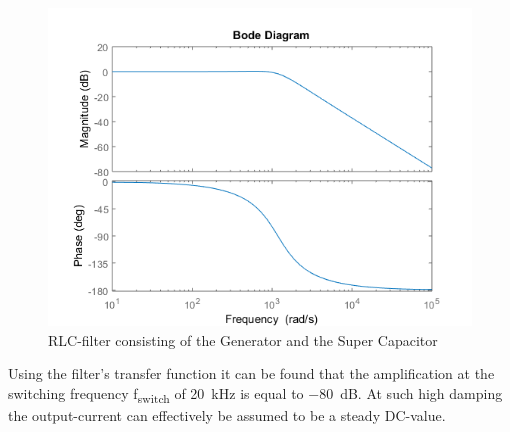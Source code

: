 \begin{figure}[H]
	\centering
	\includegraphics[width=0.7\linewidth]{Hardware/LoadSystem/BodeFilter}
	\caption{RLC-filter consisting of the Generator and the Super Capacitor}
	\label{fig:RLC_filter}
\end{figure}

Using the filter's transfer function it can be found that the amplification at the switching frequency f\textsubscript{switch} of \SI{20}{\kilo \hertz} is equal to \SI{-80}{dB}. At such high damping the output-current can effectively be assumed to be a steady DC-value.
